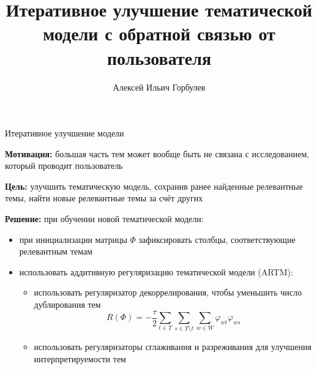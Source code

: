 \documentclass{beamer}
\title[\hbox to 56mm{Итеративное улучшение}]{Итеративное улучшение тематической \\ модели с обратной связью от пользователя}
\author[А.\,И. Горбулев]{Алексей Ильич Горбулев}
\institute{Московский физико-технический институт}
\date{\footnotesize
\par\smallskip\emph{Курс:} Моя первая научная статья/Группа Б05-021а
\par\smallskip\emph{Эксперт:} д. ф.-м. н. К.\,В.~Воронцов
\par\smallskip\emph{Консультант:} В.\,А.~Алексеев
\par\bigskip\small 2023}
\begin{document}
\begin{frame}
\thispagestyle{empty}
\maketitle
\end{frame}
\begin{frame}{Итеративное улучшение модели}

{\footnotesize \textbf{Мотивация:} большая часть тем может вообще быть не связана с исследованием, который проводит пользователь}

{\footnotesize \textbf{Цель:} улучшить тематическую модель, сохранив ранее найденные релевантные темы, найти новые релевантные темы за счёт других}

{\footnotesize \textbf{Решение:} при обучении новой тематической модели:}
\begin{itemize}
        \item {\footnotesize при инициализации матрицы $\Phi$ зафиксировать столбцы, соответствующие релевантным темам}
        \item {\footnotesize использовать аддитивную регуляризацию тематической модели (ARTM):}
        \begin{itemize}
            \item {\footnotesize использовать регуляризатор декоррелирования, чтобы уменьшить число дублирования тем $$R(\Phi) = - \frac{\tau}{2} \sum \limits_{t \in T} \sum \limits_{s \in T \setminus t} \sum \limits_{w \in W} \varphi_{wt} \varphi_{ws}$$}
            \item {\footnotesize использовать регуляризаторы сглаживания и разреживания для улучшения интерпретируемости тем}
        \end{itemize}
    \end{itemize}


\end{frame}


\end{document}
